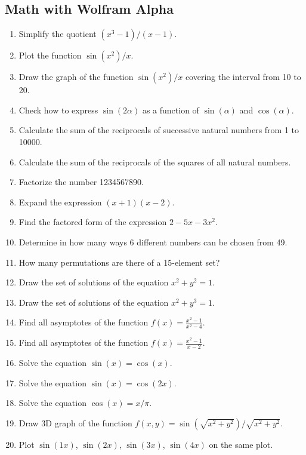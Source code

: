 \documentclass[11pt]{article}
\begin{document}
\subsection*{Math with Wolfram Alpha}
\begin{enumerate}
    \item Simplify the quotient $(x^3-1)/(x-1)$.
    \item Plot the function $\sin(x^2)/x$.
    \item Draw the graph of the function $\sin(x^2)/x$ covering the interval from 10 to 20.
    \item Check how to express $\sin(2\alpha)$ as a function of $\sin(\alpha)$ and $\cos(\alpha)$.
    \item Calculate the sum of the reciprocals of successive natural numbers from 1 to 10000.
    \item Calculate the sum of the reciprocals of the squares of all natural numbers.
    \item Factorize the number 1234567890.
    \item Expand the expression $(x+1)(x-2)$.
    \item Find the factored form of the expression $2 - 5x - 3x^2$.
    \item Determine in how many ways 6 different numbers can be chosen from 49.
    \item How many permutations are there of a 15-element set?
    \item Draw the set of solutions of the equation $x^2 + y^2 = 1$.
    \item Draw the set of solutions of the equation $x^2 + y^3 = 1$.
    \item Find all asymptotes of the function $f(x) = \frac{x^2 -1}{x^2-4}$.
    \item Find all asymptotes of the function $f(x) = \frac{x^2 -1}{x-2}$.
    \item Solve the equation $\sin(x) = \cos(x)$.
    \item Solve the equation $\sin(x) = \cos(2x)$.
    \item Solve the equation $\cos(x) = x/\pi$.
    \item Draw 3D graph of the function $f(x,y)=\sin(\sqrt{x^2+y^2})/\sqrt{x^2+y^2}$.
    \item Plot $\sin(1x)$, $\sin(2x)$, $\sin(3x)$, $\sin(4x)$ on the same plot.
\end{enumerate}
\end{document}
